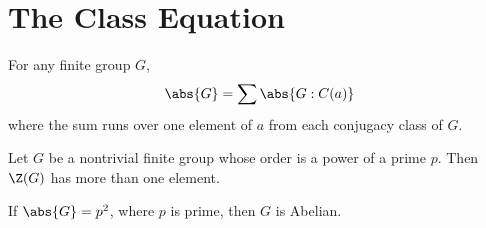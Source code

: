 \section{The Class Equation}

\begin{corollary}
	For any finite group $G$,
	\[ \abs{G} = \sum \abs{G:C(a)} \]
	where the sum runs over one element of $a$ from each conjugacy class of $G$.
\end{corollary}

\begin{theorem}
	Let $G$ be a nontrivial finite group whose order is a power of a prime $p$. Then $\Z(G)$ has more than one element.
\end{theorem}

\begin{corollary}
	If $\abs{G}=p^2$, where $p$ is prime, then $G$ is Abelian.
\end{corollary}
